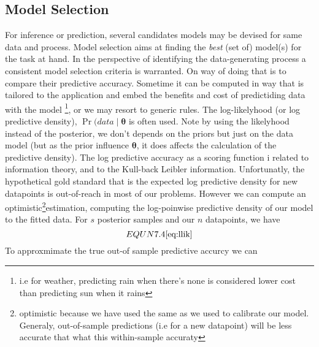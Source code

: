 \subsection{Model Selection}
For inference or prediction, several candidates models may be devised for same data and process. Model selection aims at finding the \textit{best} (set of) model(s) for the task at hand. In the perspective of identifying the data-generating process a consistent model selection criteria is warranted\parencite{Hoge:PrimerModelSelection:2018}.  On way of doing that is to compare their predictive accuracy. Sometime it can be computed in way that is tailored to the application and embed the benefits and cost of predictiding data with the model \footnote{i.e for weather, predicting rain when there’s none is considered lower cost than predicting sun when it rains}, or we may resort to generic rules.
The log-likelyhood (or log predictive density), $\Pr(data \mid \boldsymbol\theta$  is often used. Note by using the likelyhood instead of the posterior, we don’t depends on the priors but just on the data model (but as the prior influence $\boldsymbol\theta$, it does affects the calculation of the predictive density). The log predictive accuracy as a scoring function i related to information theory, and to the Kull-back Leibler information.
Unfortunatly, the hypothetical gold standard that is the expected log predictive density for new datapoints is out-of-reach in most of our problems. However we can compute an optimistic\footnote{optimistic because we have used the same as we used to calibrate our model. Generaly, out-of-sample predictions (i.e for a new datapoint) will be less accurate that what this within-sample accuraty}estimation, computing the log-poinwise predictive density of our model to the fitted data. For $s$ posterior samples and our $n$ datapoints, we have
\begin{equation}
	EQUN 7.4 \ref{eq:llik}
\end{equation}
To approxmimate the true out-of sample predictive accurcy we can 
